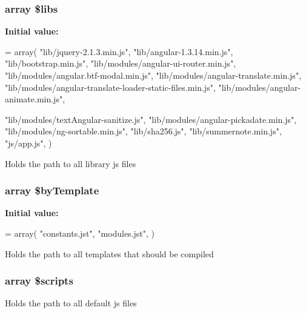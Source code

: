 \subsubsection[{\$libs}]{\setlength{\rightskip}{0pt plus 5cm}array \$libs\hspace{0.3cm}{\ttfamily [static]}}\label{a00043_af921b61f4c24e9526d11cb2e6e274f80}
{\bfseries Initial value\+:}
\begin{DoxyCode}
= array(
        \textcolor{stringliteral}{"lib/jquery-2.1.3.min.js"},
        \textcolor{stringliteral}{"lib/angular-1.3.14.min.js"},
        \textcolor{stringliteral}{"lib/bootstrap.min.js"},
        \textcolor{stringliteral}{"lib/modules/angular-ui-router.min.js"},
        \textcolor{stringliteral}{"lib/modules/angular.btf-modal.min.js"},
        \textcolor{stringliteral}{"lib/modules/angular-translate.min.js"},
        \textcolor{stringliteral}{"lib/modules/angular-translate-loader-static-files.min.js"},
        \textcolor{stringliteral}{"lib/modules/angular-animate.min.js"},
        
        \textcolor{stringliteral}{"lib/modules/textAngular-sanitize.js"},
        \textcolor{stringliteral}{"lib/modules/angular-pickadate.min.js"},
        \textcolor{stringliteral}{"lib/modules/ng-sortable.min.js"},
        \textcolor{stringliteral}{"lib/sha256.js"},
        \textcolor{stringliteral}{"lib/summernote.min.js"},
        \textcolor{stringliteral}{"js/app.js"}, 
    )
\end{DoxyCode}
Holds the path to all library js files \hypertarget{a00043_a22413c56163c8bf737718cd76a078b5c}{}
\subsubsection[{\$by\+Template}]{\setlength{\rightskip}{0pt plus 5cm}array \$by\+Template\hspace{0.3cm}{\ttfamily [static]}}\label{a00043_a22413c56163c8bf737718cd76a078b5c}
{\bfseries Initial value\+:}
\begin{DoxyCode}
= array(
        \textcolor{stringliteral}{"constants.jst"},
        \textcolor{stringliteral}{"modules.jst"},
    )
\end{DoxyCode}
Holds the path to all templates that should be compiled \hypertarget{a00043_ac1a0c3c8e4bbd9bc1a22d6147a839d75}{}
\subsubsection[{\$scripts}]{\setlength{\rightskip}{0pt plus 5cm}array \$scripts\hspace{0.3cm}{\ttfamily [static]}}\label{a00043_ac1a0c3c8e4bbd9bc1a22d6147a839d75}
Holds the path to all default js files \hypertarget{a00043_ab2cede1cb181d8cd87d9a8f5570aa121}{}
